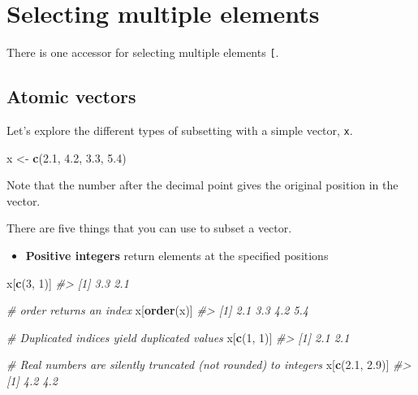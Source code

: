 \documentclass[]{book}
\newenvironment{Shaded}{\begin{snugshade}}{\end{snugshade}}
\newcommand{\CommentTok}[1]{\textcolor[rgb]{0.56,0.35,0.01}{\textit{#1}}}
\newcommand{\DecValTok}[1]{\textcolor[rgb]{0.00,0.00,0.81}{#1}}
\newcommand{\FloatTok}[1]{\textcolor[rgb]{0.00,0.00,0.81}{#1}}
\newcommand{\KeywordTok}[1]{\textcolor[rgb]{0.13,0.29,0.53}{\textbf{#1}}}
\newcommand{\NormalTok}[1]{#1}
\newcommand{\StringTok}[1]{\textcolor[rgb]{0.31,0.60,0.02}{#1}}
\providecommand{\tightlist}{%
  \setlength{\itemsep}{0pt}\setlength{\parskip}{0pt}}
\theoremstyle{definition}
\theoremstyle{definition}
\theoremstyle{definition}
\theoremstyle{remark}
\begin{document}
\hypertarget{selecting-multiple-elements}{%
\section{Selecting multiple
elements}\label{selecting-multiple-elements}}

There is one accessor for selecting multiple elements \texttt{{[}}.

\hypertarget{atomic-vectors-2}{%
\subsection{Atomic vectors}\label{atomic-vectors-2}}

Let's explore the different types of subsetting with a simple vector,
\texttt{x}.

\begin{Shaded}
\begin{Highlighting}[]
\NormalTok{x <-}\StringTok{ }\KeywordTok{c}\NormalTok{(}\FloatTok{2.1}\NormalTok{, }\FloatTok{4.2}\NormalTok{, }\FloatTok{3.3}\NormalTok{, }\FloatTok{5.4}\NormalTok{)}
\end{Highlighting}
\end{Shaded}

Note that the number after the decimal point gives the original position
in the vector.

There are five things that you can use to subset a vector.

\begin{itemize}
\tightlist
\item
  \textbf{Positive integers} return elements at the specified positions
\end{itemize}

\begin{Shaded}
\begin{Highlighting}[]
\NormalTok{x[}\KeywordTok{c}\NormalTok{(}\DecValTok{3}\NormalTok{, }\DecValTok{1}\NormalTok{)]}
\CommentTok{#> [1] 3.3 2.1}

\CommentTok{# order returns an index}
\NormalTok{x[}\KeywordTok{order}\NormalTok{(x)]}
\CommentTok{#> [1] 2.1 3.3 4.2 5.4}

\CommentTok{# Duplicated indices yield duplicated values}
\NormalTok{x[}\KeywordTok{c}\NormalTok{(}\DecValTok{1}\NormalTok{, }\DecValTok{1}\NormalTok{)]}
\CommentTok{#> [1] 2.1 2.1}

\CommentTok{# Real numbers are silently truncated (not rounded) to integers}
\NormalTok{x[}\KeywordTok{c}\NormalTok{(}\FloatTok{2.1}\NormalTok{, }\FloatTok{2.9}\NormalTok{)]}
\CommentTok{#> [1] 4.2 4.2}
\end{Highlighting}
\end{Shaded}
\end{document}
